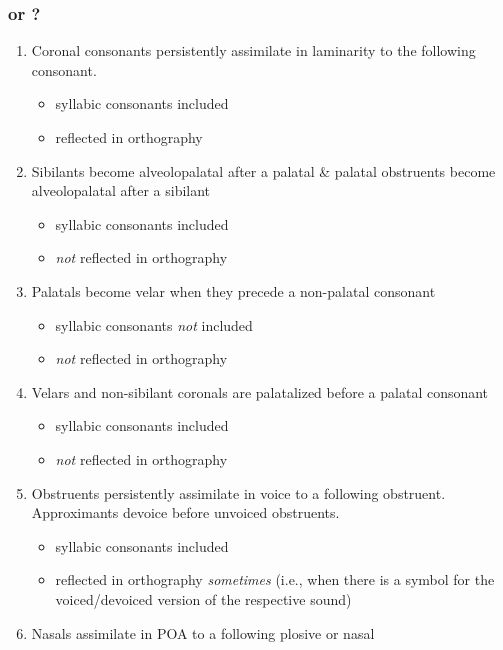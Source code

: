 \documentclass[a4paper,11pt,oneside,openany]{memoir}
\begin{document}
\subsubsection{\phipa{\glotstop} or \bripa{\glotstop}?}

\begin{enumerate}
    \item Coronal consonants persistently assimilate in laminarity to the following consonant.
    \begin{itemize}
        \item syllabic consonants included
        \item reflected in orthography
    \end{itemize}
    \item Sibilants become alveolopalatal after a palatal \& palatal obstruents become alveolopalatal after a sibilant
    \begin{itemize}
        \item syllabic consonants included
        \item \emph{not} reflected in orthography
    \end{itemize}
    \item Palatals become velar when they precede a non-palatal consonant
    \begin{itemize}
        \item syllabic consonants \emph{not} included
        \item \emph{not} reflected in orthography
    \end{itemize}
    \item Velars and non-sibilant coronals are palatalized before a palatal consonant
    \begin{itemize}
        \item syllabic consonants included
        \item \emph{not} reflected in orthography
    \end{itemize}
    \item Obstruents persistently assimilate in voice to a following obstruent. Approximants devoice before unvoiced obstruents.
    \begin{itemize}
        \item syllabic consonants included
        \item reflected in orthography \emph{sometimes} (i.e., when there is a symbol for the voiced/devoiced version of the respective sound)
    \end{itemize}
    \item Nasals assimilate in POA to a following plosive or nasal

\end{enumerate}
\end{document}
